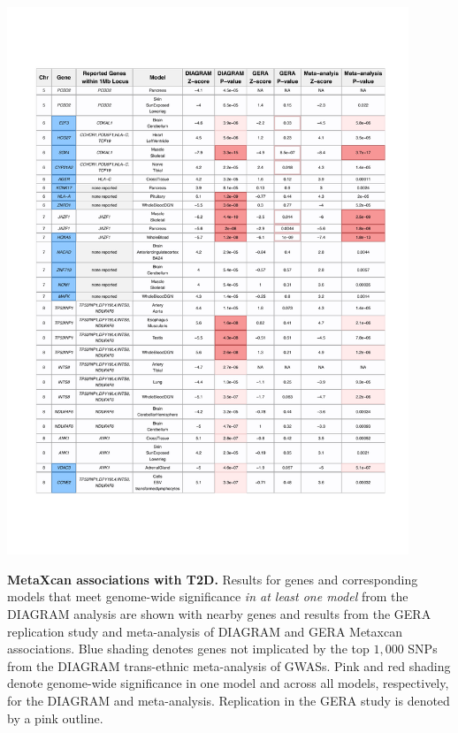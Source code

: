 \documentclass[10pt]{article}
\begin{document}
\begin{table}
	\ContinuedFloat
	\includegraphics[width=0.9\textwidth]{supp_tab1_part2.pdf}
	\caption{\textbf{MetaXcan associations with T2D.} Results for genes and corresponding models that meet genome-wide significance \textit{in at least one model} from the DIAGRAM analysis are shown with nearby genes and results from the GERA replication study and meta-analysis of DIAGRAM and GERA Metaxcan associations. Blue shading denotes genes not implicated by the top $1,000$ SNPs from the DIAGRAM trans-ethnic meta-analysis of GWASs. Pink and red shading denote genome-wide significance in one model and across all models, respectively, for the DIAGRAM and meta-analysis. Replication in the GERA study is denoted by a pink outline.} 
	\label{tab:supp.table1.part2}
\end{table}
\end{document}
